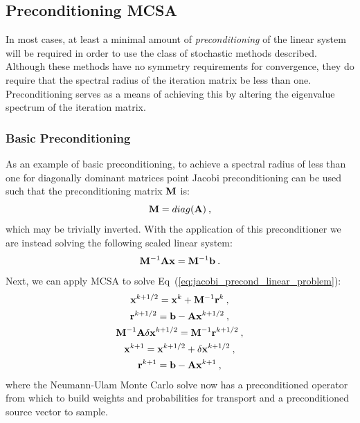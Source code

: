 \subsection{Preconditioning MCSA}
\label{subsec:stochastic_preconditioning}
In most cases, at least a minimal amount of \textit{preconditioning}
of the linear system will be required in order to use the class of
stochastic methods described. Although these methods have no symmetry
requirements for convergence, they do require that the spectral radius
of the iteration matrix be less than one. Preconditioning serves as a
means of achieving this by altering the eigenvalue spectrum of the
iteration matrix.

\subsubsection{Basic Preconditioning}
\label{subsubsec:basic_mcsa_preconditioning}
As an example of basic preconditioning, to achieve a spectral radius
of less than one for diagonally dominant matrices point Jacobi
preconditioning can be used such that the preconditioning matrix
$\mathbf{M}$ is:
\begin{equation}
  \mathbf{M} = diag(\mathbf{A})\:,
  \label{eq:jacobi_preconditioner}
\end{equation}
which may be trivially inverted. With the application of this
preconditioner we are instead solving the following scaled linear
system:
\begin{equation}
  \mathbf{M}^{-1}\mathbf{A}\mathbf{x} = \mathbf{M}^{-1}\mathbf{b}\:.
  \label{eq:jacobi_precond_linear_problem}
\end{equation}
Next, we can apply MCSA to solve
Eq~(\ref{eq:jacobi_precond_linear_problem}): 
\begin{subequations}
  \begin{gather}
    \mathbf{x}^{k+1/2} = \mathbf{x}^k +
    \mathbf{M}^{-1}\mathbf{r}^k\:,\\ \mathbf{r}^{k+1/2} =
    \mathbf{b}-\mathbf{A}\mathbf{x}^{k+1/2}\:,\\ \mathbf{M}^{-1}\mathbf{A}\delta\mathbf{x}^{k+1/2}
    = \mathbf{M}^{-1}\mathbf{r}^{k+1/2}\:,\\ \mathbf{x}^{k+1} = \mathbf{x}^{k+1/2} +
    \delta \mathbf{x}^{k+1/2}\:,\\
    \mathbf{r}^{k+1} = \mathbf{b} - \mathbf{A}\mathbf{x}^{k+1}\:,
    \label{eq:jacobi_preconditioned_mcsa}
  \end{gather}
\end{subequations}
where the Neumann-Ulam Monte Carlo solve now has a preconditioned
operator from which to build weights and probabilities for transport
and a preconditioned source vector to sample.


